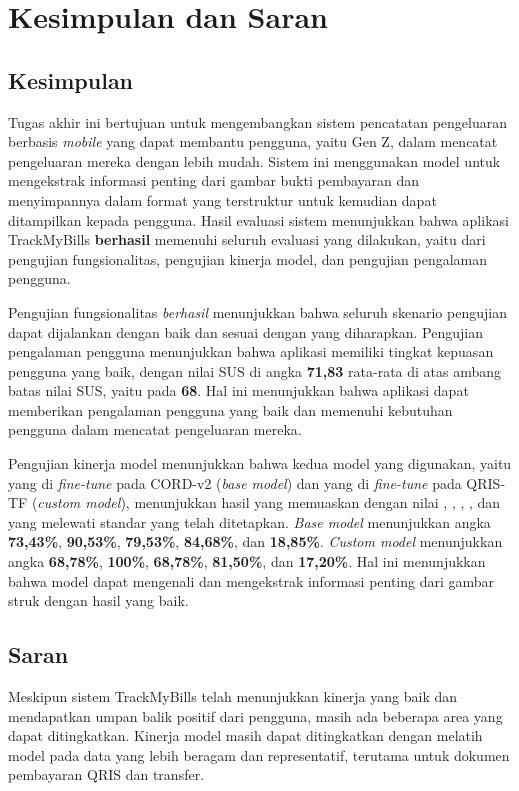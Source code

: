 \chapter{Kesimpulan dan Saran}

\section{Kesimpulan}
\label{sec:kesimpulan}
Tugas akhir ini bertujuan untuk mengembangkan sistem pencatatan pengeluaran berbasis \emph{mobile} yang dapat membantu pengguna, yaitu Gen Z, dalam mencatat pengeluaran mereka dengan lebih mudah. Sistem ini menggunakan model \donut{} untuk mengekstrak informasi penting dari gambar bukti pembayaran dan menyimpannya dalam format yang terstruktur untuk kemudian dapat ditampilkan kepada pengguna. Hasil evaluasi sistem menunjukkan bahwa aplikasi TrackMyBills \textbf{berhasil} memenuhi seluruh evaluasi yang dilakukan, yaitu dari pengujian fungsionalitas, pengujian kinerja model, dan pengujian pengalaman pengguna. 

Pengujian fungsionalitas \emph{berhasil} menunjukkan bahwa seluruh skenario pengujian dapat dijalankan dengan baik dan sesuai dengan yang diharapkan. Pengujian pengalaman pengguna menunjukkan bahwa aplikasi memiliki tingkat kepuasan pengguna yang baik, dengan nilai SUS di angka \textbf{71,83} rata-rata di atas ambang batas nilai SUS, yaitu pada \textbf{68}. Hal ini menunjukkan bahwa aplikasi dapat memberikan pengalaman pengguna yang baik dan memenuhi kebutuhan pengguna dalam mencatat pengeluaran mereka.

Pengujian kinerja model menunjukkan bahwa kedua model yang digunakan, yaitu \donut{} yang di \emph{fine-tune} pada \dataset{} CORD-v2 (\emph{base model}) dan \donut{} yang di \emph{fine-tune} pada \dataset{} QRIS-TF (\emph{custom model}), menunjukkan hasil yang memuaskan dengan nilai \accuracy, \precision, \recall, \fscore, dan \mcer{} yang melewati standar yang telah ditetapkan. \emph{Base model} menunjukkan angka \accuracy{} \textbf{73,43\%}, \precision{} \textbf{90,53\%}, \recall{} \textbf{79,53\%}, \fscore{} \textbf{84,68\%}, dan \mcer{} \textbf{18,85\%}. \emph{Custom model} menunjukkan angka \accuracy{} \textbf{68,78\%}, \precision{} \textbf{100\%}, \recall{} \textbf{68,78\%}, \fscore{} \textbf{81,50\%}, dan \mcer{} \textbf{17,20\%}. Hal ini menunjukkan bahwa model dapat mengenali dan mengekstrak informasi penting dari gambar struk dengan hasil yang baik. 

\section{Saran}
\label{sec:saran}
Meskipun sistem TrackMyBills telah menunjukkan kinerja yang baik dan mendapatkan umpan balik positif dari pengguna, masih ada beberapa area yang dapat ditingkatkan. Kinerja model \donut{} masih dapat ditingkatkan dengan melatih model pada data yang lebih beragam dan representatif, terutama untuk dokumen pembayaran QRIS dan transfer. 


